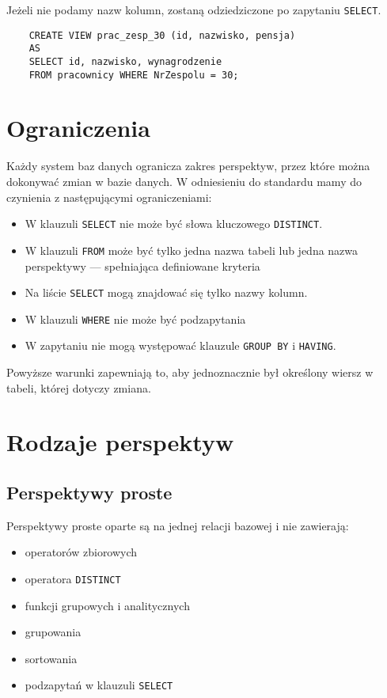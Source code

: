 \documentclass{article}
\begin{document}
Jeżeli nie podamy nazw kolumn, zostaną odziedziczone po zapytaniu \texttt{SELECT}.

\begin{verbatim}
    CREATE VIEW prac_zesp_30 (id, nazwisko, pensja)
    AS
    SELECT id, nazwisko, wynagrodzenie
    FROM pracownicy WHERE NrZespolu = 30;
\end{verbatim}

\section{Ograniczenia}

Każdy system baz danych ogranicza zakres perspektyw, przez które można dokonywać zmian w bazie danych. W odniesieniu do standardu mamy do czynienia z następującymi ograniczeniami:

\begin{itemize}
    \item W klauzuli \texttt{SELECT} nie może być słowa kluczowego \texttt{DISTINCT}.
    \item W klauzuli \texttt{FROM} może być tylko jedna nazwa tabeli lub jedna nazwa perspektywy --- spełniająca definiowane kryteria
    \item Na liście \texttt{SELECT} mogą znajdować się tylko nazwy kolumn.
    \item W klauzuli \texttt{WHERE} nie może być podzapytania
    \item W zapytaniu nie mogą występować klauzule \texttt{GROUP BY} i \texttt{HAVING}.
\end{itemize}

Powyższe warunki zapewniają to, aby jednoznacznie był określony wiersz w tabeli, której dotyczy zmiana.

\section{Rodzaje perspektyw}

\subsection{Perspektywy proste}

Perspektywy proste oparte są na jednej relacji bazowej i nie zawierają:

\begin{itemize}
    \item operatorów zbiorowych
    \item operatora \texttt{DISTINCT}
    \item funkcji grupowych i analitycznych
    \item grupowania
    \item sortowania
    \item podzapytań w klauzuli \texttt{SELECT}
\end{itemize}
\end{document}
